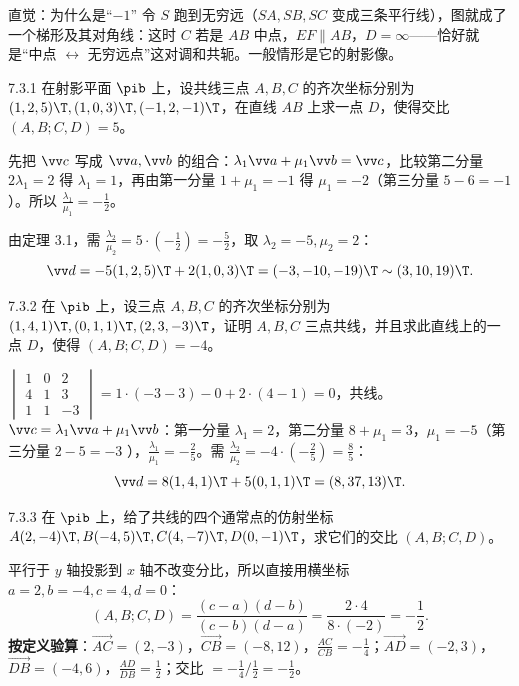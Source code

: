 \begin{intbox}{直觉：为什么是“$-1$”}
令 $S$ 跑到无穷远（$SA,SB,SC$ 变成三条平行线），图就成了一个梯形及其对角线：这时 $C$ 若是 $AB$ 中点，$EF\parallel AB$，$D=\infty$——恰好就是“中点 $\leftrightarrow$ 无穷远点”这对调和共轭。一般情形是它的射影像。
\end{intbox}


\begin{ex}{7.3.1}
在射影平面 $\pib$ 上，设共线三点 $A,B,C$ 的齐次坐标分别为 $(1,2,5)\T,(1,0,3)\T,(-1,2,-1)\T$，在直线 $AB$ 上求一点 $D$，使得交比 $(A,B;C,D)=5$。
\end{ex}
\jie 先把 $\vv c$ 写成 $\vv a,\vv b$ 的组合：$\lambda_1\vv a+\mu_1\vv b=\vv c$，比较第二分量 $2\lambda_1=2$ 得 $\lambda_1=1$，再由第一分量 $1+\mu_1=-1$ 得 $\mu_1=-2$（第三分量 $5-6=-1$ \checkmark）。所以 $\frac{\lambda_1}{\mu_1}=-\frac12$。

由定理 3.1，需 $\frac{\lambda_2}{\mu_2}=5\cdot\left(-\frac12\right)=-\frac52$，取 $\lambda_2=-5,\mu_2=2$：
\[
\vv d=-5(1,2,5)\T+2(1,0,3)\T=(-3,-10,-19)\T\sim(3,10,19)\T .
\]

\begin{ex}{7.3.2}
在 $\pib$ 上，设三点 $A,B,C$ 的齐次坐标分别为 $(1,4,1)\T,(0,1,1)\T,(2,3,-3)\T$，证明 $A,B,C$ 三点共线，并且求此直线上的一点 $D$，使得 $(A,B;C,D)=-4$。
\end{ex}
\jie $\begin{vmatrix}1&0&2\\4&1&3\\1&1&-3\end{vmatrix}=1\cdot(-3-3)-0+2\cdot(4-1)=0$，共线。$\vv c=\lambda_1\vv a+\mu_1\vv b$：第一分量 $\lambda_1=2$，第二分量 $8+\mu_1=3$，$\mu_1=-5$（第三分量 $2-5=-3$ \checkmark），$\frac{\lambda_1}{\mu_1}=-\frac25$。需 $\frac{\lambda_2}{\mu_2}=-4\cdot\left(-\frac25\right)=\frac85$：
\[
\vv d=8(1,4,1)\T+5(0,1,1)\T=(8,37,13)\T .
\]

\begin{ex}{7.3.3}
在 $\pib$ 上，给了共线的四个通常点的仿射坐标 $A(2,-4)\T,B(-4,5)\T,C(4,-7)\T,D(0,-1)\T$，求它们的交比 $(A,B;C,D)$。
\end{ex}
\jie 平行于 $y$ 轴投影到 $x$ 轴不改变分比，所以直接用横坐标 $a=2,b=-4,c=4,d=0$：
\[
(A,B;C,D)=\frac{(c-a)(d-b)}{(c-b)(d-a)}=\frac{2\cdot4}{8\cdot(-2)}=-\frac12 .
\]
\textbf{按定义验算}：$\overrightarrow{AC}=(2,-3)$，$\overrightarrow{CB}=(-8,12)$，$\frac{AC}{CB}=-\frac14$；$\overrightarrow{AD}=(-2,3)$，$\overrightarrow{DB}=(-4,6)$，$\frac{AD}{DB}=\frac12$；交比 $=-\frac14\big/\frac12=-\frac12$。

